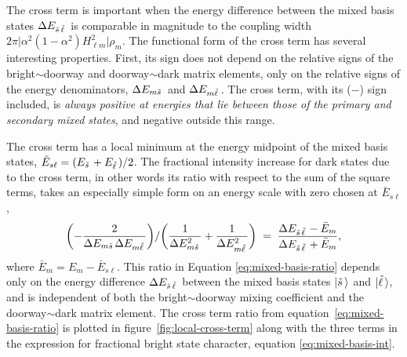 The cross term is important when the energy difference
between the mixed basis states $\Delta E_{\tilde{s}\, \tilde{\ell}\,}$ is comparable in
magnitude to the coupling width $2 \pi \lvert \alpha^2 (1-\alpha^2)
H_{\ell m}^2 \rvert \rho_m$.
The functional form of the cross term has several interesting
properties.  First, its sign does not depend on the relative signs of
the bright$\sim$doorway and doorway$\sim$dark matrix elements, only on
the relative signs of the energy denominators, $\Delta E_{m \tilde{s}\,}$ and
$\Delta E_{m \tilde{\ell}\,}$. The cross term, with its ($-$) sign included, is
\emph{always positive at energies that lie between those of the
  primary and secondary mixed states}, and negative outside this
range.

The cross term has a local minimum at the energy midpoint of the mixed
basis states, $\bar{E}_{s \ell} = (E_{\tilde{s}\,} + E_{\tilde{\ell}\,})/2$. The
fractional intensity increase for dark states due to the cross term,
in other words its ratio with respect to the sum of the square terms,
takes an especially simple form on an energy scale with zero chosen at
$\bar{E}_{s \ell}$,
\begin{equation}
  \label{eq:mixed-basis-ratio}
  \biggl( - \frac{2}{\Delta E_{m \tilde{s}\,} \Delta E_{m \tilde{\ell}\,}} \biggr) / 
  \biggl( \frac{1}{\Delta E_{m \tilde{s}\,}^2} +\frac{1}{\Delta E_{m \tilde{\ell}\,}^2} \biggr)
  \; = \; \frac{\Delta E_{\tilde{s}\, \tilde{\ell}\,} - \bar{E}_m}{\Delta E_{\tilde{s}\, \tilde{\ell}\,} + \bar{E}_m},
\end{equation}
where $\bar{E}_m = E_m - \bar{E}_{s \ell}$.  This ratio in Equation
\ref{eq:mixed-basis-ratio} depends only on the energy difference
$\Delta E_{\tilde{s}\,\tilde{\ell}\,}$ between the mixed basis states $\mathinner{|{\tilde{s}\,}\rangle}$ and
$\mathinner{|{\tilde{\ell}\,}\rangle}$, and is independent of both the bright$\sim$doorway mixing
coefficient and the doorway$\sim$dark matrix element.  The cross term
ratio from equation~\ref{eq:mixed-basis-ratio} is plotted in
figure~\ref{fig:local-cross-term} along with the three terms in the
expression for fractional bright state character, equation
\ref{eq:mixed-basis-int}.

